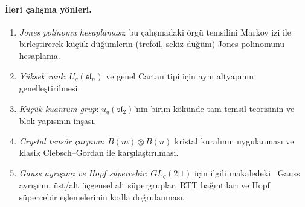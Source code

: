 \documentclass[12pt,a4paper,fleqn]{report}
\numberwithin{equation}{chapter}
\theoremstyle{plain}
\theoremstyle{definition}
\renewcommand{\sl}{\mathfrak{sl}}
\begin{document}
\paragraph{İleri çalışma yönleri.}
\begin{enumerate}[leftmargin=*]
  \item \emph{Jones polinomu hesaplaması}: bu çalışmadaki örgü temsilini Markov
        izi ile birleştirerek küçük düğümlerin (trefoil, sekiz-düğüm) Jones
        polinomunu hesaplama.
  \item \emph{Yüksek rank}: $U_q(\sl_n)$ ve genel Cartan tipi için aynı
        altyapının genelleştirilmesi.
  \item \emph{Küçük kuantum grup}: $u_q(\sl_2)$'nin birim kökünde tam
        temsil teorisinin ve blok yapısının inşası.
  \item \emph{Crystal tensör çarpımı}: $B(m) \otimes B(n)$ kristal
        kuralının uygulanması ve klasik Clebsch--Gordan ile karşılaştırılması.
  \item \emph{Gauss ayrışımı ve Hopf süpercebir}: $GL_q(2|1)$ için
        ilgili makaledeki~\cite{CelikGL21} Gauss ayrışımı, üst/alt üçgensel alt süpergruplar, RTT
        bağıntıları ve Hopf süpercebir eşlemelerinin kodla doğrulanması.
\end{enumerate}
\end{document}
